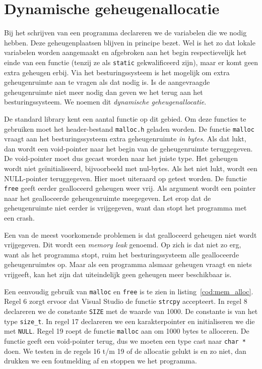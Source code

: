 \section{Dynamische geheugenallocatie}
Bij het schrijven van een programma declareren we de variabelen die we nodig hebben. Deze geheugenplaatsen blijven in principe bezet. Wel is het zo dat lokale variabelen worden aangemaakt en afgebroken aan het begin respectievelijk het einde van een functie (tenzij ze als \texttt{static} gekwalificeerd zijn), maar er komt geen extra geheugen erbij. Via het besturingssysteem is het mogelijk om extra geheugenruimte aan te vragen als dat nodig is. Is de aangevraagde geheugenruimte niet meer nodig dan geven we het terug aan het besturingssysteem. We noemen dit \textsl{dynamische geheugenallocatie}.

De standard library kent een aantal functie op dit gebied. Om deze functies te gebruiken moet het header-bestand \texttt{malloc.h} geladen worden. De functie \texttt{malloc} vraagt aan het besturingssysteem extra geheugenruimte \textsl{in bytes}. Als dat lukt, dan wordt een void-pointer naar het begin van de geheugenruimte teruggegeven. De void-pointer moet dus gecast worden naar het juiste type. Het geheugen wordt niet geïnitialiseerd, bijvoorbeeld met nul-bytes. Als het niet lukt, wordt een NULL-pointer teruggegeven. Hier moet uiteraard op getest worden. De functie \texttt{free} geeft eerder gealloceerd geheugen weer vrij. Als argument wordt een pointer naar het gealloceerde geheugenruimte meegegeven. Let erop dat de geheugenruimte niet eerder is vrijgegeven, want dan stopt het programma met een crash.

Een van de meest voorkomende problemen is dat gealloceerd geheugen niet wordt vrijgegeven. Dit wordt een \textsl{memory leak} genoemd. Op zich is dat niet zo erg, want als het programma stopt, ruim het besturingssysteem alle gealloceerde geheugenruimtes op. Maar als een programma alsmaar geheugen vraagt en niets vrijgeeft, kan het zijn dat uiteindelijk geen geheugen meer beschikbaar is.

Een eenvoudig gebruik van \texttt{malloc} en \texttt{free} is te zien in listing~\ref{cod:mem_alloc}. Regel 6 zorgt ervoor dat Visual Studio de functie \texttt{strcpy} accepteert. In regel 8 declareren we de constante \texttt{SIZE} met de waarde van 1000. De constante is van het type \texttt{size\_t}. In regel 17 declareren we een karakterpointer en initialiseren we die met \texttt{NULL}. Regel 19 roept de functie \texttt{malloc} aan om 1000 bytes te alloceren. De functie geeft een void-pointer terug, dus we moeten een type cast naar \texttt{char *} doen. We testen in de regels 16 t/m 19 of de allocatie gelukt is en zo niet, dan drukken we een foutmelding af en stoppen we het programma.

